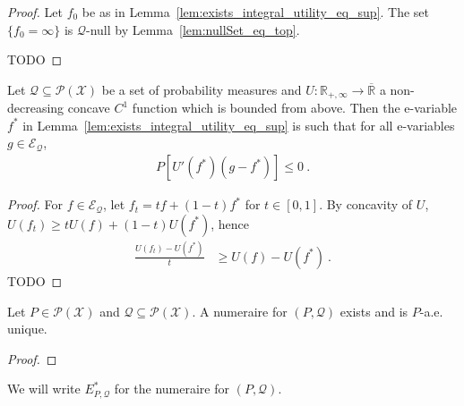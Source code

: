 \begin{proof}
Let $f_0$ be as in Lemma~\ref{lem:exists_integral_utility_eq_sup}.
The set $\{f_0 = \infty\}$ is $\mathcal{Q}$-null by Lemma~\ref{lem:nullSet_eq_top}.

TODO
\end{proof}


\begin{lemma}\label{lem:bounded_numeraire_first_order}
Let $\mathcal{Q} \subseteq \mathcal{P}(\mathcal{X})$ be a set of probability measures and $U : \mathbb{R}_{+,\infty} \to \overline{\mathbb{R}}$ a non-decreasing concave $C^1$ function which is bounded from above.
Then the e-variable $f^*$ in Lemma~\ref{lem:exists_integral_utility_eq_sup} is such that for all e-variables $g \in \mathcal{E}_{\mathcal{Q}}$,
\begin{align*}
  P\left[ U'(f^*) (g - f^*) \right] \le 0 \: .
\end{align*}
\end{lemma}

\begin{proof}
For $f \in \mathcal{E}_{\mathcal{Q}}$, let $f_t = t f + (1-t) f^*$ for $t \in [0,1]$.
By concavity of $U$, $U(f_t) \ge t U(f) + (1-t) U(f^*)$, hence
\begin{align*}
  \frac{U(f_t) - U(f^*)}{t}
  &\ge U(f) - U(f^*)
  \: .
\end{align*}
TODO
\end{proof}


\begin{theorem}\label{thm:exists_numeraire}
Let $P \in \mathcal{P}(\mathcal{X})$ and $\mathcal{Q} \subseteq \mathcal{P}(\mathcal{X})$.
A numeraire for $(P, \mathcal{Q})$ exists and is $P$-a.e. unique.
\end{theorem}

\begin{proof}

\end{proof}

We will write $E^*_{P, \mathcal{Q}}$ for the numeraire for $(P, \mathcal{Q})$.
